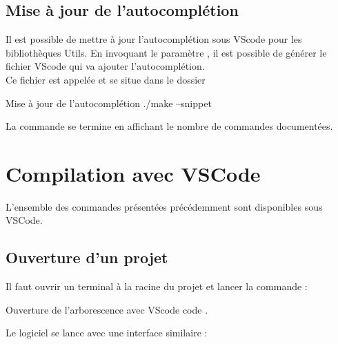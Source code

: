 {


\label{setLayout}
\subsection{Mise à jour de l'autocomplétion}

Il est possible de mettre à jour l'autocomplétion sous VScode pour les bibliothèques Utils.
En invoquant le paramètre , il est possible de générer le fichier VScode qui va ajouter l'autocomplétion.\\
Ce fichier est appelée  et se situe dans le dossier 

\begin{Bash}{Mise à jour de l'autocomplétion}
./make --snippet
\end{Bash}

La commande se termine en affichant le nombre de commandes documentées.







\section{Compilation avec VSCode}

L'ensemble des commandes présentées précédemment sont disponibles sous VSCode.\\

\subsection{Ouverture d'un projet}

Il faut ouvrir un terminal à la racine du projet et lancer la commande : 

\begin{Bash}{Ouverture de l'arborescence avec VScode}
code .
\end{Bash}


Le logiciel se lance avec une interface similaire :


}
